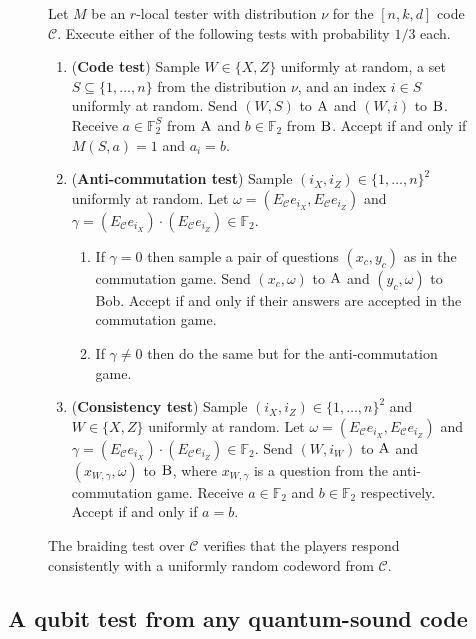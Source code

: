 \documentclass[11pt]{article}
\theoremstyle{definition}
\newcommand{\code}{\mathcal{C}}
\newcommand{\field}{\mathbb{F}_2}
\newcommand{\rand}{\textrm{rand}}
\newcommand{\labelstyle}[1]{\ensuremath{\textsc{#1}}\xspace}
\newcommand{\alice}{\labelstyle{A}}
\newcommand{\bob}{\labelstyle{B}}
\newenvironment{gamespec}{
  \begin{mdframed}[style=figstyle]}{
  \end{mdframed}}
\begin{document}
\begin{figure}[!htbp]
  \centering
  \begin{gamespec}
Let $M$ be an $r$-local tester with distribution $\nu$ for the $[n,k,d]$ code $\code$.  Execute either of the following tests with probability $1/3$ each. 
    \begin{enumerate}
      \setlength\itemsep{1pt}
    \item (\textbf{Code test}) Sample $W\in \{X,Z\}$ uniformly at random, a set $S \subseteq \{1,\ldots,n\}$ from the distribution $\nu$, and an index $i \in S$ uniformly at random. 
    Send $(W,S)$ to $\alice$ and $(W,i)$ to $\bob$. Receive $a\in \field^S$ from $\alice$ and $b\in \field$ from $\bob$. Accept if and only if $M(S,a)=1$ and $a_i = b$.  
    \item (\textbf{Anti-commutation test}) Sample $(i_X,i_Z)\in \{1,\ldots,n\}^2 $ uniformly at random. Let $\omega = (E_\code e_{i_X}, E_\code e_{i_Z})$ and $\gamma =  (E_\code e_{i_X}) \cdot(E_\code e_{i_Z}) \in \field$. 
		\begin{enumerate} 
		\item If $\gamma=0$ then sample a pair of questions $(x_c,y_c)$ as in the commutation game. Send $(x_c,\omega)$ to $\alice$ and $(y_c,\omega)$ to Bob. Accept if and only if their answers are accepted in the commutation game. 
		\item If $\gamma\neq 0$ then do the same but for the anti-commutation game. 
		\end{enumerate} 
		 \item (\textbf{Consistency test}) Sample $(i_X,i_Z)\in \{1,\ldots,n\}^2 $ and $W\in \{X,Z\}$ uniformly at random. Let $\omega=(E_\code e_{i_X}, E_\code e_{i_Z})$ and $\gamma = (E_\code e_{i_X}) \cdot(E_\code e_{i_Z}) \in \field$. Send $(W,i_W)$ to $\alice$ and $(x_{W,\gamma},\omega)$ to $\bob$, where $x_{W,\gamma}$ is a question from the anti-commutation game. Receive $a\in \field$ and $b\in \field$ respectively. Accept if and only if $a=b$. 
    \end{enumerate}
  \end{gamespec}
  \caption{The braiding test over $\code$ verifies that the players respond consistently with a uniformly random codeword from $\code$.}
  \label{fig:braiding-test}
\end{figure}

\subsection{A qubit test from any quantum-sound code}
\end{document}
